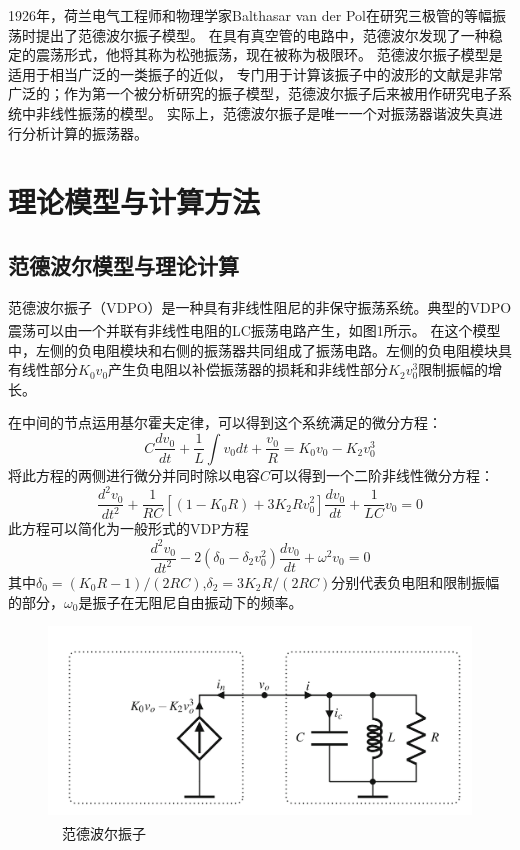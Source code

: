 \documentclass[10.5pt,oneside,a4paper]{article}
\theoremstyle{mystyle}
\begin{document}
1926年，荷兰电气工程师和物理学家Balthasar van der Pol在研究三极管的等幅振荡时提出了范德波尔振子模型。
在具有真空管的电路中，范德波尔发现了一种稳定的震荡形式，他将其称为松弛振荡，现在被称为极限环。
范德波尔振子模型是适用于相当广泛的一类振子的近似，
专门用于计算该振子中的波形的文献是非常广泛的；作为第一个被分析研究的振子模型，范德波尔振子后来被用作研究电子系统中非线性振荡的模型。
实际上，范德波尔振子是唯一一个对振荡器谐波失真进行分析计算的振荡器。

\section{理论模型与计算方法}

\subsection{范德波尔模型与理论计算}

范德波尔振子（VDPO）是一种具有非线性阻尼的非保守振荡系统。典型的VDPO震荡可以由一个并联有非线性电阻的LC振荡电路产生，如图1所示\textsuperscript{\cite{Casaleiro2019}}。
在这个模型中，左侧的负电阻模块和右侧的振荡器共同组成了振荡电路。左侧的负电阻模块具有线性部分$K_0v_0$产生负电阻以补偿振荡器的损耗和非线性部分$K_2v_0^3$限制振幅的增长。

在中间的节点运用基尔霍夫定律，可以得到这个系统满足的微分方程：
\begin{equation}
    C\frac{dv_0}{dt}+\frac{1}{L}\int v_0dt+\frac{v_0}{R}=K_0v_0-K_2v_0^3
\end{equation}
将此方程的两侧进行微分并同时除以电容$C$可以得到一个二阶非线性微分方程：
\begin{equation}
    \frac{d^2 v_0}{dt^2}+\frac{1}{RC}[(1-K_0R)+3K_2Rv_0^2]\frac{dv_0}{dt}+\frac{1}{LC}v_0=0
\end{equation}
此方程可以简化为一般形式的VDP方程
\begin{equation}
    \frac{d^2 v_0}{dt^2}-2(\delta_0-\delta_2v_0^2)\frac{dv_0}{dt}+\omega^2v_0=0
\end{equation}
其中$\delta_0=(K_0R-1)/(2RC)$,$\delta_2=3K_2R/(2RC)$分别代表负电阻和限制振幅的部分，$\omega_0$是振子在无阻尼自由振动下的频率。

\begin{figure}[h]
    \centering
    \includegraphics[width=0.8\linewidth]{VDPO.png}
    \caption{$\quad$范德波尔振子\textsuperscript{\cite{Casaleiro2019}}}
\end{figure}
\end{document}
